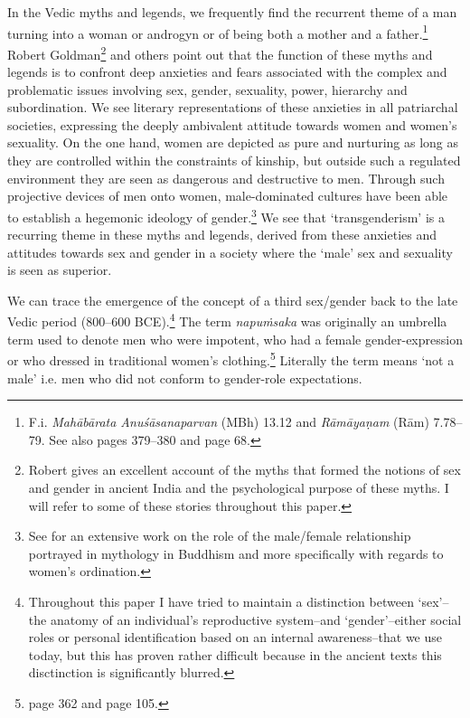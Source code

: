 In the Vedic myths and legends, we frequently find the recurrent theme of a man turning into a woman or androgyn or of being both a mother and a father.\footnote{F.i. \textit{Mahābārata Anuśāsanaparvan} (MBh) 13.12 and \textit{Rāmāyaṇam} (Rām) 7.78–79. See also \cite{goldman} pages 379–380 and \cite{cassell} page 68.} Robert Goldman\footnote{Robert \cite{goldman} gives an excellent account of the myths that formed the notions of sex and gender in ancient India and the psychological purpose of these myths. I will refer to some of these stories throughout this paper.} and others point out that the function of these myths and legends is to confront deep anxieties and fears associated with the complex and problematic issues involving sex, gender, sexuality, power, hierarchy and subordination. We see literary representations of these anxieties in all patriarchal societies, expressing the deeply ambivalent attitude towards women and women's sexuality. On the one hand, women are depicted as pure and nurturing as long as they are controlled within the constraints of kinship, but outside such a regulated environment they are seen as dangerous and destructive to men. Through such projective devices of men onto women, male-dominated cultures have been able to establish a hegemonic ideology of gender.\footnote{See \cite{sujato2011} for an extensive work on the role of the male/female relationship portrayed in mythology in Buddhism and more specifically with regards to women's ordination.} We see that `transgenderism' is a recurring theme in these myths and legends, derived from these anxieties and attitudes towards sex and gender in a society where the `male' sex and sexuality is seen as superior.

We can trace the emergence of the concept of a third sex/gender back to the late Vedic period (800–600 BCE).\footnote{Throughout this paper I have tried to maintain a distinction between `sex'--the anatomy of an individual's reproductive system--and `gender'--either social roles or personal identification based on an internal awareness--that we use today, but this has proven rather difficult because in the ancient texts this disctinction is significantly blurred.} The term \textit{napuṁsaka} was originally an umbrella term used to denote men who were impotent, who had a female gender-expression or who dressed in traditional women's clothing.\footnote{\cite{zwilling} page 362 and \cite{zwilling2000} page 105.} Literally the term means `not a male' i.e. men who did not conform to gender-role expectations.

